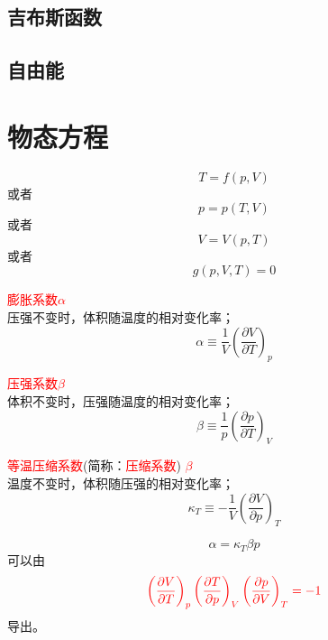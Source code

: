 \documentclass[12pt,a4paper]{article}
\begin{document}
\subsection{吉布斯函数}

\subsection{自由能}



\section{物态方程}
\begin{equation}
T = f(p, V)
\end{equation}
或者
\begin{equation}
p = p(T, V)
\end{equation}
或者
\begin{equation}
V = V(p, T)
\end{equation}
或者
\begin{equation}
g(p, V, T) = 0
\end{equation}

\textcolor{red}{膨胀系数$\alpha$} \\
压强不变时，体积随温度的相对变化率；
\begin{equation}
\alpha \equiv \frac{1}{V} \left( \frac{\partial V}{\partial T} \right)_p
\end{equation}

\textcolor{red}{压强系数$\beta$} \\
体积不变时，压强随温度的相对变化率；
\begin{equation}
\beta \equiv \frac{1}{p} \left( \frac{\partial p}{\partial T} \right)_V
\end{equation}

\textcolor{red}{等温压缩系数}(简称：\textcolor{red}{压缩系数}) \textcolor{red}{$\beta$} \\
温度不变时，体积随压强的相对变化率；
\begin{equation}
\kappa_T \equiv -\frac{1}{V} \left( \frac{\partial V}{\partial p} \right)_T
\end{equation}

\begin{equation}
\alpha = \kappa_T \beta p
\end{equation}
可以由
\begin{equation}
\color{red} \left( \frac{\partial V}{\partial T} \right)_p  \left( \frac{\partial T}{\partial p} \right)_V \left( \frac{\partial p}{\partial V} \right)_T = -1
\end{equation}
导出。
\end{document}
